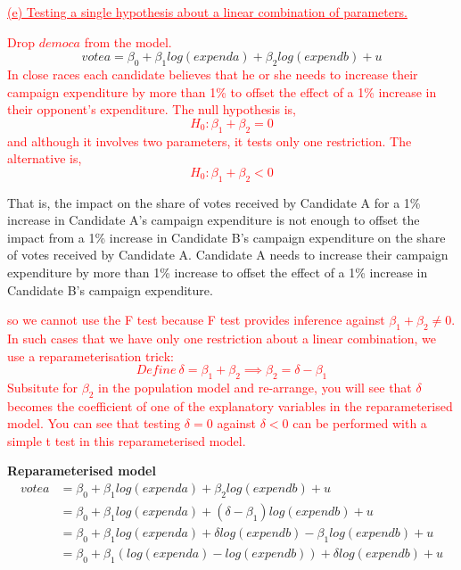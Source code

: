 \documentclass[12pt]{report}
\begin{document}
\newpage
\noindent \textcolor{red}
{
	\uline{(e) Testing a single hypothesis about a linear combination of parameters.}
}

\noindent \textcolor{red}
{
	Drop $democa$ from the model.
}
$$votea = \beta_0 + \beta_1log(expenda) + \beta_2log(expendb) + u $$
\noindent \textcolor{red}
{
	In close races each candidate believes that he or she needs to increase their campaign expenditure by more than 1\% to offset the effect of a 1\% increase in their opponent’s expenditure. The null hypothesis is,
	$$H_0: \beta_1 + \beta_2 = 0$$ 
	and although it involves two parameters, it tests only one restriction. The alternative is, 
	$$H_0: \beta_1 + \beta_2 < 0$$ 
}

\noindent That is, the impact on the share of votes received by Candidate A for a 1\% increase in Candidate A’s campaign expenditure is not enough to offset the impact from a 1\% increase in Candidate B’s campaign expenditure on the share of votes received by Candidate A. Candidate A needs to increase their campaign expenditure by more than 1\% increase to  offset the effect of a 1\% increase in Candidate B's campaign expenditure.

\noindent \textcolor{red}
{
	so we cannot use the F test because F test provides inference against $\beta_1 + \beta_2 \neq 0$. In such cases that we have only one restriction about a linear combination, we use a reparameterisation trick: 
	$$Define\ \delta = \beta_1 + \beta_2 \implies \beta_2 = \delta - \beta_1$$
	Subsitute for $\beta_2$ in the population model and re-arrange, you will see that $\delta$ becomes the coefficient of one of the explanatory variables in the reparameterised model.
	You can see that testing $\delta = 0$ against $\delta < 0$ can be performed with a simple t test in this reparameterised model.
}

\noindent \textbf{Reparameterised model}
\begin{align*}
	votea &= \beta_0 + \beta_1log(expenda) + \beta_2log(expendb) + u \\
	&= \beta_0 + \beta_1log(expenda) + (\delta - \beta_1)log(expendb) + u \\
	&= \beta_0 + \beta_1log(expenda) + {\delta}log(expendb) - \beta_1log(expendb) + u \\
	&= \beta_0 + \beta_1(log(expenda)-log(expendb)) + {\delta}log(expendb) + u
\end{align*}
\end{document}
